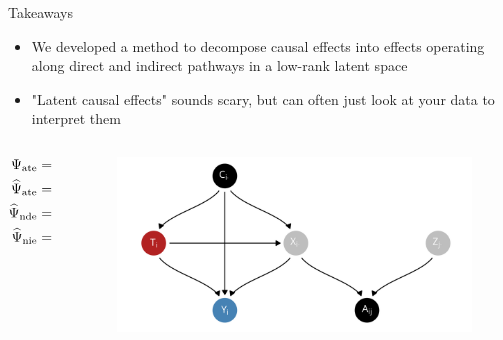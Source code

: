 \documentclass[aspectratio=169]{beamer}
\theoremstyle{remark}
\begin{document}
\begin{frame}{Takeaways}

    \begin{itemize}
        \item We developed a method to decompose causal effects into effects operating along direct and indirect pathways in a low-rank latent space
        \item "Latent causal effects" sounds scary, but can often just look at your data to interpret them
    \end{itemize}

    \begin{columns}
        \begin{column}{0.3 \textwidth}
            \begin{align*}
                \Psi_\mathrm{ate}    & = \Psi_\mathrm{nde} + \Psi_\mathrm{nie}  \\
                \widehat{\Psi}_\mathrm{ate} & = -2.7 \pm 1.3 \\
                \widehat{\Psi}_\mathrm{nde} & = -1.8 \pm 1.1 \\
                \widehat{\Psi}_\mathrm{nie} & = -1 \pm 0.7
            \end{align*}
        \end{column}
        \begin{column}{0.7 \textwidth}
            \centering
            \begin{figure}[ht]
                \includegraphics[width=\textwidth]{figures/dags/bipartite-mediation.png}
            \end{figure}
        \end{column}
    \end{columns}
\end{frame}




\end{document}
